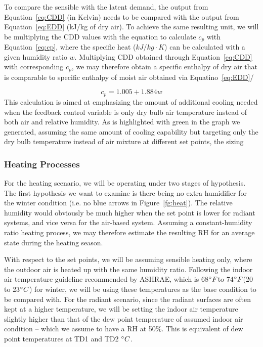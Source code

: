     To compare the sensible with the latent demand, the output from Equation~\ref{eq:CDD} (in Kelvin) needs to be compared with the output from Equation~\ref{eq:EDD} (kJ/kg of dry air). To achieve the same resulting unit, we will be multiplying the CDD values with the equation to calculate $c_p$ with Equation~\ref{eq:cp}, where the specific heat ($kJ/kg\cdot K$) can be calculated with a given  humidity ratio $w$. Multiplying CDD obtained through Equation~\ref{eq:CDD} with corresponding $c_p$, we may therefore obtain a specific enthalpy of dry air that is comparable to specific enthalpy of moist air obtained via Equatino~\ref{eq:EDD}/

    \begin{equation}
    c_p = 1.005 + 1.884 w \label{eq:cp}
    \end{equation}
    This calculation is aimed at emphasizing the amount of additional cooling needed when the feedback control variable is only dry bulb air temperature instead of both air and relative humidity. As is highlighted with green in the graph we generated, assuming the same amount of cooling capability but targeting only the dry bulb temperature instead of air mixture at different set points, the sizing  

\subsubsection{Heating Processes}
    For the heating scenario, we will be operating under two stages of hypothesis. The first hypothesis we want to examine is there being no extra humidifier for the winter condition (i.e. no blue arrows in Figure~\ref{fg:heat}). The relative humidity would obviously be much higher when the set point is lower for radiant systems, and vice versa for the air-based system. Assuming a constant-humidity ratio heating process, we may therefore estimate the resulting RH for an average state during the heating season.  

    With respect to the set points, we will be assuming sensible heating only, where the outdoor air is heated up with the same humidity ratio. Following the indoor air temperature guideline recommended by ASHRAE, which is 68$\degree F$to 74$\degree F$(20 to 23$\degree C$) for winter, we will be using these temperatures as the base condition to be compared with. For the radiant scenario, since the radiant surfaces are often kept at a higher temperature, we will be setting the indoor air temperature slightly higher than that of the dew point temperature of assumed indoor air condition – which we assume to have a RH at 50\%. This is equivalent of dew point temperatures at TD1 and TD2 $\degree C$. 


